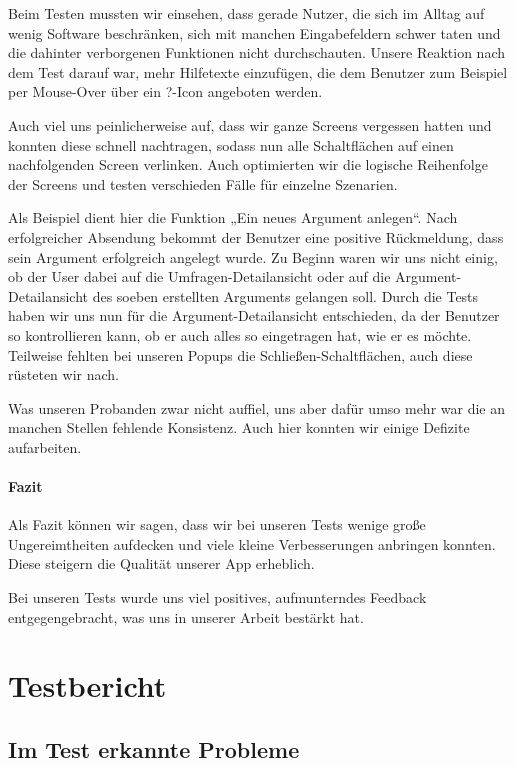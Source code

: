 Beim Testen mussten wir einsehen, dass gerade Nutzer, die sich im Alltag auf wenig Software beschränken, sich mit manchen Eingabefeldern schwer taten und die dahinter verborgenen Funktionen nicht durchschauten. Unsere Reaktion nach dem Test darauf war, mehr Hilfetexte einzufügen, die dem Benutzer zum Beispiel per Mouse-Over über ein ?-Icon angeboten werden. 

Auch viel uns peinlicherweise auf, dass wir ganze Screens vergessen hatten und konnten diese schnell nachtragen, sodass nun alle Schaltflächen auf einen nachfolgenden Screen verlinken. 
Auch optimierten wir die logische Reihenfolge der Screens und testen verschieden Fälle für einzelne Szenarien.

Als Beispiel dient hier die Funktion „Ein neues Argument anlegen“. Nach erfolgreicher Absendung bekommt der Benutzer eine positive Rückmeldung, dass sein Argument erfolgreich angelegt wurde. Zu Beginn waren wir uns nicht einig, ob der User dabei auf die Umfragen-Detailansicht oder auf die Argument-Detailansicht des soeben erstellten Arguments gelangen soll. Durch die Tests haben wir uns nun für die Argument-Detailansicht entschieden, da der Benutzer so kontrollieren kann, ob er auch alles so eingetragen hat, wie er es möchte. 
Teilweise fehlten bei unseren Popups die Schließen-Schaltflächen, auch diese rüsteten wir nach.

Was unseren Probanden zwar nicht auffiel, uns aber dafür umso mehr war die an manchen Stellen fehlende Konsistenz. Auch hier konnten wir einige Defizite aufarbeiten.

\paragraph{Fazit}
Als Fazit können wir sagen, dass wir bei unseren Tests wenige große Ungereimtheiten aufdecken und viele kleine Verbesserungen anbringen konnten. Diese steigern die Qualität unserer App erheblich. 

Bei unseren Tests wurde uns viel positives, aufmunterndes Feedback entgegengebracht, was uns in unserer Arbeit bestärkt hat.



\section{Testbericht}
\label{sec:testbericht}

\subsection{Im Test erkannte Probleme}
\label{sec:foundproblemes}

